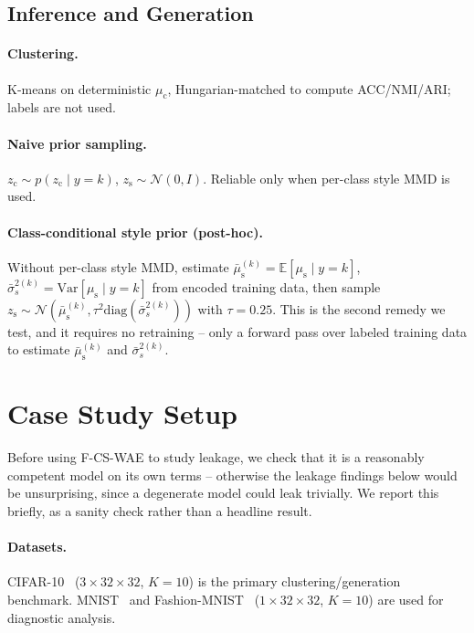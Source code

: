 \documentclass[10pt,letterpaper]{article}
\newcommand{\ours}{F-CS-WAE}
\newcommand{\zc}{z_{\mathrm{c}}}
\newcommand{\zs}{z_{\mathrm{s}}}
\newcommand{\muc}{\mu_{\mathrm{c}}}
\newcommand{\mus}{\mu_{\mathrm{s}}}
\newcommand{\diag}{\mathrm{diag}}
\begin{document}
\subsection{Inference and Generation}

\paragraph{Clustering.} K-means on deterministic $\muc$, Hungarian-matched
to compute ACC/NMI/ARI; labels are not used.

\paragraph{Naive prior sampling.} $\zc\sim p(\zc\mid y{=}k)$,
$\zs\sim\mathcal{N}(0,I)$. Reliable only when per-class style MMD is used.

\paragraph{Class-conditional style prior (post-hoc).} Without per-class
style MMD, estimate $\bar\mus^{(k)}=\mathbb{E}[\mus\mid y{=}k]$,
$\bar\sigma_s^{2(k)}=\mathrm{Var}[\mus\mid y{=}k]$ from encoded training
data, then sample $\zs\sim\mathcal{N}(\bar\mus^{(k)},\tau^2\diag(\bar\sigma_s^{2(k)}))$
with $\tau=0.25$. This is the second remedy we test, and it requires no
retraining -- only a forward pass over labeled training data to estimate
$\bar\mus^{(k)}$ and $\bar\sigma_s^{2(k)}$.

\section{Case Study Setup}
\label{sec:cifar10-setup}

Before using \ours{} to study leakage, we check that it is a reasonably
competent model on its own terms -- otherwise the leakage findings below
would be unsurprising, since a degenerate model could leak trivially. We
report this briefly, as a sanity check rather than a headline result.

\paragraph{Datasets.} CIFAR-10~\citep{krizhevsky2009learning}
($3{\times}32{\times}32$, $K{=}10$) is the primary clustering/generation
benchmark. MNIST~\citep{lecun1998gradient} and
Fashion-MNIST~\citep{xiao2017fashion} ($1{\times}32{\times}32$, $K{=}10$)
are used for diagnostic analysis.
\end{document}
